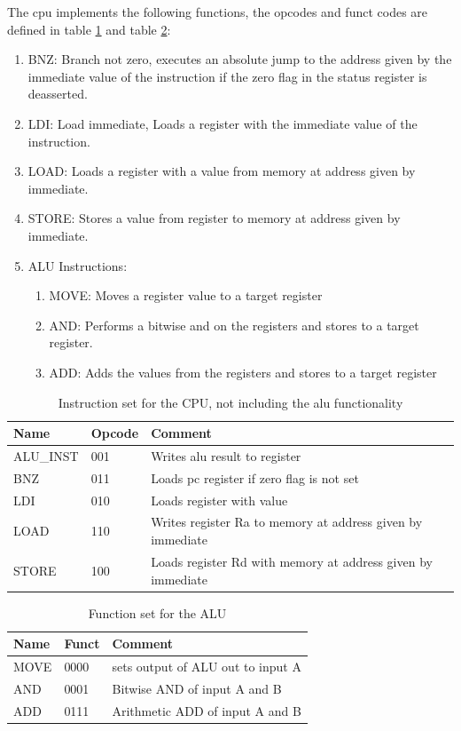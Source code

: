 \documentclass[11pt]{report}
\begin{document}
The cpu implements the following functions, the opcodes and funct 
codes are defined in table \ref{tab:opcodes} and table \ref{tab:functcodes}:
\begin{enumerate}
  \item BNZ: Branch not zero, executes an absolute jump to the address given by
the immediate value of the instruction if the zero flag in the status register is deasserted.
  \item LDI: Load immediate, Loads a register with the immediate value of the instruction.
  \item LOAD: Loads a register with a value from memory at address given by immediate.
  \item STORE: Stores a value from register to memory at address given by immediate.
  \item ALU Instructions:
  \begin{enumerate}
    \item MOVE: Moves a register value to a target register
    \item AND: Performs a bitwise and on the registers and stores to a target register.
    \item ADD: Adds the values from the registers and stores to a target register
  \end{enumerate}
\end{enumerate}

\begin{table}[h]
  \centering
  \begin{tabular}{|l|l|l|}
    \hline
    Name&Opcode&Comment \\
    \hline
    ALU\_INST	&001	&Writes alu result to register\\
    BNZ			&011	&Loads pc register if zero flag is not set\\
    LDI			&010	&Loads register with value\\
    LOAD		&110	&Writes register Ra to memory at address given by immediate\\
    STORE		&100	&Loads register Rd with memory at address given by immediate\\
    \hline
  \end{tabular}
  \caption{Instruction set for the CPU, not including the alu functionality}
  \label{tab:opcodes}
\end{table}

\begin{table}[h]
  \centering
  \begin{tabular}{|l|l|l|}
    \hline
    Name&Funct&Comment \\
    \hline
    MOVE	&0000	& sets output of ALU out to input A\\
    AND		&0001	& Bitwise AND of input A and B\\
    ADD		&0111	& Arithmetic ADD of input A and B\\
    \hline
  \end{tabular}
  \caption{Function set for the ALU}
  \label{tab:functcodes}
\end{table}
\end{document}
